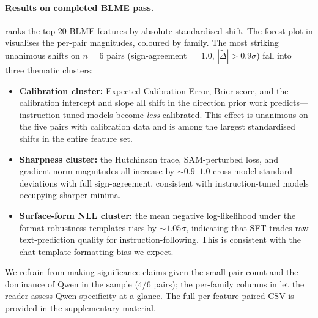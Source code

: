 \documentclass[preprint]{neurips_2025}
\begin{document}
\paragraph{Results on completed BLME pass.}
 ranks the top $20$ BLME features by absolute standardised shift. The forest plot in  visualises the per-pair magnitudes, coloured by family. The most striking unanimous shifts on $n = 6$ pairs (sign-agreement $= 1.0$, $|\widetilde{\Delta}| > 0.9\sigma$) fall into three thematic clusters:
\begin{itemize}
  \item \textbf{Calibration cluster:} Expected Calibration Error, Brier score, and the calibration intercept and slope all shift in the direction prior work predicts---instruction-tuned models become \emph{less} calibrated. This effect is unanimous on the five pairs with calibration data and is among the largest standardised shifts in the entire feature set.
  \item \textbf{Sharpness cluster:} the Hutchinson trace, SAM-perturbed loss, and gradient-norm magnitudes all increase by $\sim\!0.9$--$1.0$ cross-model standard deviations with full sign-agreement, consistent with instruction-tuned models occupying sharper minima.
  \item \textbf{Surface-form NLL cluster:} the mean negative log-likelihood under the format-robustness templates rises by $\sim\!1.05\sigma$, indicating that SFT trades raw text-prediction quality for instruction-following. This is consistent with the chat-template formatting bias we expect.
\end{itemize}
We refrain from making significance claims given the small pair count and the dominance of Qwen in the sample (4/6 pairs); the per-family columns in  let the reader assess Qwen-specificity at a glance. The full per-feature paired CSV is provided in the supplementary material.

\begin{table}[t]
\centering
\caption{Top 20 BLME features by absolute cross-model standardised shift after instruction tuning ($n = 6$ pairs). Columns: $n$ = number of pairs with finite values on both sides (per-family breakdown in subscript: Q = Qwen 3.5, L = Llama 3, G = Gemma 4); $\Delta$ = mean signed difference (instruct $-$ base) in raw units; $\Delta_{\sigma}$ = $\Delta$ normalised by the cross-model standard deviation of the metric; $d$ = Cohen's $d$; \textbf{Agree.} = fraction of pairs moving in the same direction as the mean (1.0 = unanimous, primary evidence at small $n$); $q$ = Benjamini--Hochberg-corrected paired Wilcoxon $p$-value (uninformative at $n = 6$, included for completeness). Arrows indicate the direction of the mean shift.}
\label{tab:bvi-shifts}
\small

\end{table}
\end{document}
